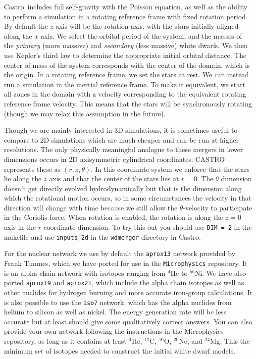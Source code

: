 \documentclass[12pt]{book}
\newcommand{\castro}{{\sf Castro}}
\begin{document}
\castro\ includes full self-gravity with the Poisson equation, as well as the ability to perform a
simulation in a rotating reference frame with fixed rotation period. By default the $z$ axis will 
be the rotation axis, with the stars initially aligned along the $x$ axis. We select the 
orbital period of the system, and the masses of the \textit{primary} (more massive) and 
\textit{secondary} (less massive) white dwarfs. We then use Kepler's third law to determine the 
appropriate initial orbital distance. The center of mass of the system corresponds with the center 
of the domain, which is the origin. In a rotating reference frame, we set the stars at rest. 
We can instead run a simulation in the inertial reference frame. To make it equivalent, we
start all zones in the domain with a velocity corresponding to the equivalent rotating 
reference frame velocity. This means that the stars will be synchronously rotating (though we
may relax this assumption in the future).

Though we are mainly interested in 3D simulations, it is sometimes useful to compare to 2D
simulations which are much cheaper and can be run at higher resolutions. The only physically
meaningful analogue to these mergers in lower dimensions occurs in 2D axisymmetric cylindrical
coordinates. CASTRO represents these as $(r,z,\theta)$. In this coordinate system we enforce
that the stars lie along the $z$ axis and that the center of the stars lies at $r = 0$. The
$\theta$ dimension doesn't get directly evolved hydrodynamically but that is the dimension
along which the rotational motion occurs, so in some circumstances the velocity in that
direction will change with time because we still allow the $\theta$-velocity to participate in
the Coriolis force. When rotation is enabled, the rotation is along the $z = 0$ axis in the $r$
coordinate dimension. To try this out you should use \texttt{DIM = 2} in the makefile and
use \texttt{inputs\_2d} in the \texttt{wdmerger} directory in \castro.

For the nuclear network we use by default the \texttt{aprox13} network provided by Frank Timmes, which 
we have ported for use in the \texttt{Microphysics} repository. It is an alpha-chain network 
with isotopes ranging from ${}^4$He to ${}^{56}$Ni. We have also ported \texttt{aprox19} and
\texttt{aprox21}, which include the alpha chain isotopes as well as other nuclides for hydrogen
burning and more accurate iron-group calculations. It is also possible to use the \texttt{iso7}
network, which has the alpha nuclides from helium to silicon as well as nickel. The energy generation
rate will be less accurate but at least should give some qualitatively correct answers. You can also
provide your own network following the instructions in the Microphysics repository, as long as it
contains at least ${}^4$He, ${}^{12}$C, ${}^{16}$O, ${}^{20}$Ne, and ${}^{24}$Mg. This the minimum
set of isotopes needed to construct the initial white dwarf models.
\end{document}

